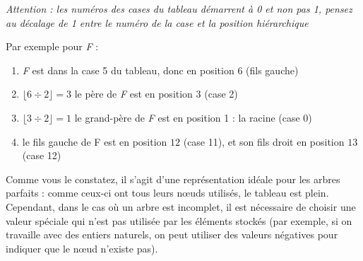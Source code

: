 \documentclass[11pt,a4paper]{article}
\begin{document}
\textit{Attention : les numéros des cases du tableau démarrent à 0 et non pas 1, pensez au décalage de 1 entre le numéro de la case et la position hiérarchique}

\bigskip

Par exemple pour \textit{F} :
\begin{enumerate}[label=\alph*)]
\item \textit{F} est dans la case 5 du tableau, donc en position 6 (fils gauche)
\item $ \lfloor 6 \div 2 \rfloor = 3 $ le père de \textit{F} est en position 3 (case 2)
\item $ \lfloor 3 \div 2 \rfloor = 1 $ le grand-père de \textit{F} est en position 1 : la racine (case 0)
\item le fils gauche de F est en position $ 12 $ (case 11), et son fils droit en position $ 13 $ (case 12)
\end{enumerate}

\bigskip

Comme vous le constatez, il s'agit d'une représentation idéale pour les arbres parfaits : comme ceux-ci ont tous leurs nœuds utilisés, le tableau est plein.
Cependant, dans le cas où un arbre est incomplet, il est nécessaire de choisir une valeur spéciale qui n'est pas utilisée par les éléments stockés (par exemple, si on travaille avec des entiers naturels, on peut utiliser des valeurs négatives pour indiquer que le nœud n'existe pas).

\bigskip
\end{document}
